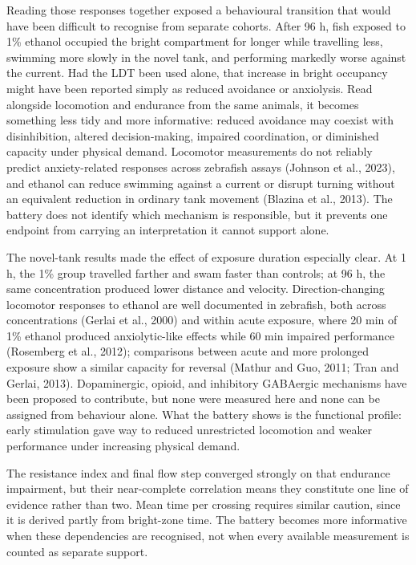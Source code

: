 \documentclass[12pt,a4paper]{article}
\begin{document}
Reading those responses together exposed a behavioural transition that would have been difficult to recognise from separate cohorts. After 96 h, fish exposed to 1\% ethanol occupied the bright compartment for longer while travelling less, swimming more slowly in the novel tank, and performing markedly worse against the current. Had the LDT been used alone, that increase in bright occupancy might have been reported simply as reduced avoidance or anxiolysis. Read alongside locomotion and endurance from the same animals, it becomes something less tidy and more informative: reduced avoidance may coexist with disinhibition, altered decision-making, impaired coordination, or diminished capacity under physical demand. Locomotor measurements do not reliably predict anxiety-related responses across zebrafish assays (Johnson et al., 2023), and ethanol can reduce swimming against a current or disrupt turning without an equivalent reduction in ordinary tank movement (Blazina et al., 2013). The battery does not identify which mechanism is responsible, but it prevents one endpoint from carrying an interpretation it cannot support alone.

The novel-tank results made the effect of exposure duration especially clear. At 1 h, the 1\% group travelled farther and swam faster than controls; at 96 h, the same concentration produced lower distance and velocity. Direction-changing locomotor responses to ethanol are well documented in zebrafish, both across concentrations (Gerlai et al., 2000) and within acute exposure, where 20 min of 1\% ethanol produced anxiolytic-like effects while 60 min impaired performance (Rosemberg et al., 2012); comparisons between acute and more prolonged exposure show a similar capacity for reversal (Mathur and Guo, 2011; Tran and Gerlai, 2013). Dopaminergic, opioid, and inhibitory GABAergic mechanisms have been proposed to contribute, but none were measured here and none can be assigned from behaviour alone. What the battery shows is the functional profile: early stimulation gave way to reduced unrestricted locomotion and weaker performance under increasing physical demand.

The resistance index and final flow step converged strongly on that endurance impairment, but their near-complete correlation means they constitute one line of evidence rather than two. Mean time per crossing requires similar caution, since it is derived partly from bright-zone time. The battery becomes more informative when these dependencies are recognised, not when every available measurement is counted as separate support.
\end{document}
